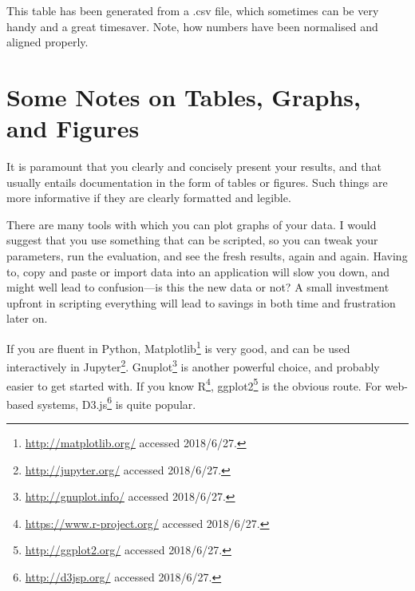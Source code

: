 \begin{table}
  \myfloatalign
  \caption[An auto-generated table]{This table has been generated from a
    .csv file, which sometimes can be very handy and a great timesaver. Note, how numbers have been normalised and aligned properly.}
  \label{tab:pretty-table}
\end{table}



\section{Some Notes on Tables, Graphs, and Figures}
\label{sec:some-notes-tables}

It is paramount that you clearly and concisely present your results, and
that usually entails documentation in the form of tables or figures.  Such
things are more informative if they are clearly formatted and legible.

There are many tools with which you can plot graphs of your data. I would
suggest that you use something that can be scripted, so you can tweak your
parameters, run the evaluation, and see the fresh results, again and
again. Having to, \eg copy and paste or import data into an application will
slow you down, and might well lead to confusion---is this the new data or
not? A small investment upfront in scripting everything will lead to
savings in both time and frustration later on.

If you are fluent in Python,
Matplotlib\footnote{\url{http://matplotlib.org/} accessed 2018/6/27.} is very good, and can be
used interactively in
Jupyter\footnote{\url{http://jupyter.org/} accessed 2018/6/27.}. Gnuplot\footnote{\url{http://gnuplot.info/} accessed 2018/6/27.}
is another powerful choice, and probably easier to get started with. If you
know R\footnote{\url{https://www.r-project.org/} accessed 2018/6/27.},
ggplot2\footnote{\url{http://ggplot2.org/} accessed 2018/6/27.} is the obvious route.  For
web-based systems, D3.js\footnote{\url{http://d3jsp.org/} accessed 2018/6/27.} is quite popular.

